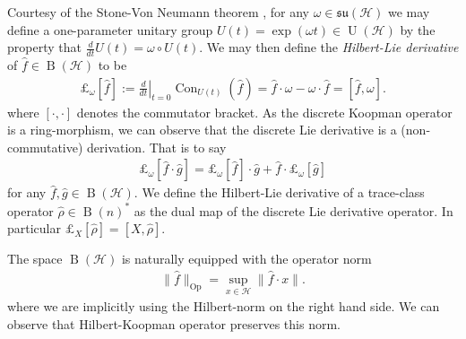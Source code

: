 \documentclass[12pt]{amsart}
\renewcommand{\H}{\ensuremath{\mathcal{H}}}
\DeclareMathOperator{\U}{U}
\DeclareMathOperator{\B}{B}
\DeclareMathOperator{\Op}{Op}
\DeclareMathOperator{\Con}{Con}
\begin{document}
Courtesy of the Stone-Von Neumann theorem \cite{Conway1990},
for any $\omega \in \mathfrak{su}(\H)$ we may define a one-parameter unitary group $U(t) = \exp( \omega t) \in \U(\H)$
by the property that $\frac{d}{dt} U(t) = \omega \circ U(t)$.
We may then define the \emph{Hilbert-Lie derivative} of $\hat{f} \in \B(\H)$ to be
\begin{align*}
	\pounds_{\omega}[ \hat{f}] := \left. \frac{d}{d t} \right|_{t=0} \Con_{U(t)}(\hat{f} ) = \hat{f} \cdot \omega - \omega \cdot \hat{f} = [ \hat{f} , \omega].
\end{align*}
where $[ \cdot , \cdot ]$ denotes the commutator bracket.
As the discrete Koopman operator is a ring-morphism, we can observe that the discrete Lie derivative is a (non-commutative) derivation.
That is to say
\begin{align*}
	\pounds_{\omega}[ \hat{f} \cdot \hat{g} ] = \pounds_{\omega} [ \hat{f}] \cdot \hat{g} + \hat{f} \cdot \pounds_{\omega} [\hat{g}]
\end{align*}
for any $\hat{f},\hat{g} \in \B(\H)$.
We define the Hilbert-Lie derivative of a trace-class operator $\hat{\rho} \in \B(n)^*$ as the dual map of the discrete Lie derivative operator.
In particular $\pounds_X[\hat{\rho}] = [X,\hat{\rho}]$.

The space $\B(\H)$ is naturally equipped with the operator norm
\begin{align*}
	\| \hat{f} \|_{\Op} = \sup_{x \in \H} \| \hat{f} \cdot x \|.
\end{align*}
where we are implicitly using the Hilbert-norm on the right hand side.
We can observe that Hilbert-Koopman operator preserves this norm.
\end{document}
